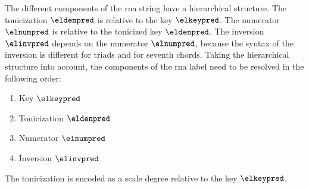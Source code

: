 
The different components of the \gls{rna} string have a
hierarchical structure. The tonicization $\eldenpred$ is
relative to the key $\elkeypred$. The numerator $\elnumpred$
is relative to the tonicized key $\eldenpred$. The inversion
$\elinvpred$ depends on the numerator $\elnumpred$, because
the syntax of the inversion is different for triads and for
seventh chords. Taking the hierarchical structure into
account, the components of the \gls{rna} label need to be
resolved in the following order:

\begin{enumerate} 
    \item Key $\elkeypred$ 
    \item Tonicization $\eldenpred$ 
    \item Numerator $\elnumpred$ 
    \item Inversion $\elinvpred$ 
\end{enumerate}


The tonicization is encoded as a scale degree relative to
the key $\elkeypred$.

